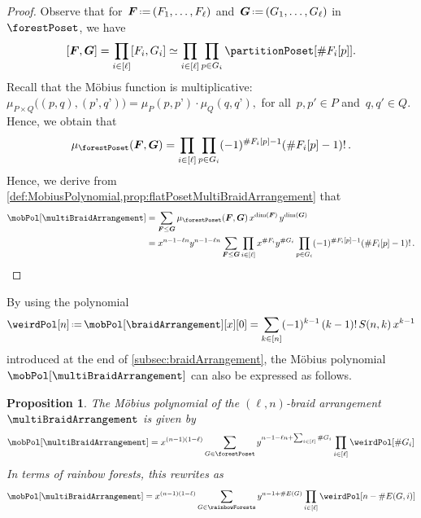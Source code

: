 \documentclass{amsart}
\newtheorem{proposition}[theorem]{Proposition}
\theoremstyle{definition}
\renewcommand{\b}[1]{{\boldsymbol{#1}}} %
\newcommand{\eqdef}{\mbox{\,\raisebox{0.2ex}{\scriptsize\ensuremath{\mathrm:}}\ensuremath{=}\,}} %
\renewcommand{\b}[1]{\boldsymbol{#1}} %
\begin{document}
\begin{proof}
Observe that for~$\b{F} \eqdef (F_1, \dots, F_\ell)$ and~$\b{G} \eqdef (G_1, \dots, G_\ell)$ in~$\forestPoset$, we have
\[
[\b{F}, \b{G}] = \prod_{i \in [\ell]} [F_i, G_i] \simeq \prod_{i \in [\ell]} \prod_{p \in G_i} \partitionPoset[{\#F_i[p]}].
\]
Recall that the M\"obius function is multiplicative:
\(
\mu_{P \times Q} \big( (p,q), (p’,q’) \big) = \mu_P(p,p’) \cdot \mu_Q(q,q’),
\)
for all~$p, p' \in P$ and~$q, q' \in Q$.
Hence, we obtain that
\[
\mu_{\forestPoset}(\b{F}, \b{G}) = \prod_{i \in [\ell]} \prod_{p \in G_i} (-1)^{\#F_i[p]-1} (\# F_i[p]-1)! \, .
\]
Hence, we derive from \cref{def:MobiusPolynomial,prop:flatPosetMultiBraidArrangement} that
\begin{align*}
\mobPol[\multiBraidArrangement] 
& = \sum_{\b{F} \le \b{G}} \mu_{\forestPoset}(\b{F}, \b{G}) \, x^{\dim(\b{F})} \, y^{\dim(\b{G})} \\
& = x^{n-1-\ell n} y^{n-1-\ell n} \sum_{\b{F} \le \b{G}} \prod_{i \in [\ell]} x^{\#F_i} y^{\#G_i} \prod_{p \in G_i} (-1)^{\#F_i[p]-1} (\# F_i[p]-1)! \, .
\qedhere
\end{align*}
\end{proof}

By using the polynomial
\[
\weirdPol[n] \eqdef \mobPol[\braidArrangement][x][0] = \sum_{k \in [n]} (-1)^{k-1} \, (k-1)! \, S(n,k) \, x^{k-1}
\]
introduced at the end of \cref{subsec:braidArrangement}, the M\"obius polynomial~$\mobPol[\multiBraidArrangement]$ can also be expressed as follows.

\pagebreak
\begin{proposition} 
The M\"obius polynomial of the $(\ell,n)$-braid arrangement~$\multiBraidArrangement$ is given by
\[
\mobPol[\multiBraidArrangement] = x^{(n-1)(1-\ell)} \sum_{G \in \forestPoset} y^{n-1-\ell n+\sum_{i \in [\ell]} \#G_i}  \prod_{i \in [\ell]} \weirdPol[\#G_i]
\]
In terms of rainbow forests, this rewrites as
\[
\mobPol[\multiBraidArrangement] = x^{(n-1)(1-\ell)} \sum_{G \in \rainbowForests} y^{n-1+\#E(G)}  \prod_{i \in [\ell]} \weirdPol[n-\#E(G,i)]
\]
\end{proposition}
\end{document}
